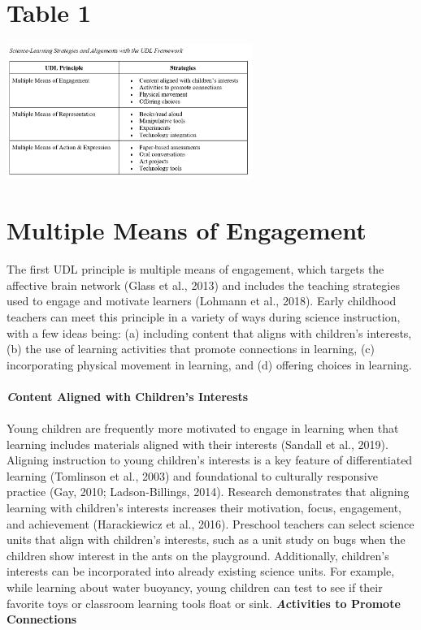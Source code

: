 \documentclass[11.5pt]{sig-alternate}
\begin{document}
\begin{large}
\section*{Table 1}
  \includegraphics[width=8cm]{Table 1.png}
    \label{Science-Learning Strategies and Alignments with the UDL Framework}   

\section*{Multiple Means of Engagement}
The first UDL principle is multiple means of engagement, which targets the affective brain network (Glass et al., 2013) and includes the teaching strategies used to engage and motivate learners (Lohmann et al., 2018). Early childhood teachers can meet this principle in a variety of ways during science instruction, with a few ideas being: (a) including content that aligns with children’s interests, (b) the use of learning activities that promote connections in learning, (c) incorporating physical movement in learning, and (d) offering choices in learning.
\\\\
\textbf{\emph Content Aligned with Children’s Interests}\\\\
Young children are frequently more motivated to engage in learning when that learning includes materials aligned with their interests (Sandall et al., 2019). Aligning instruction to young children’s interests is a key feature of differentiated learning (Tomlinson et al., 2003) and foundational to culturally responsive practice (Gay, 2010; Ladson-Billings, 2014). Research demonstrates that aligning learning with children’s interests increases their motivation, focus, engagement, and achievement (Harackiewicz et al., 2016). Preschool teachers can select science units that align with children’s interests, such as a unit study on bugs when the children show interest in the ants on the playground. Additionally, children’s interests can be incorporated into already existing science units. For example, while learning about water buoyancy, young children can test to see if their favorite toys or classroom learning tools float or sink.  
\newpage
\textbf{\emph Activities to Promote Connections}


\end{large}
\end{document}
